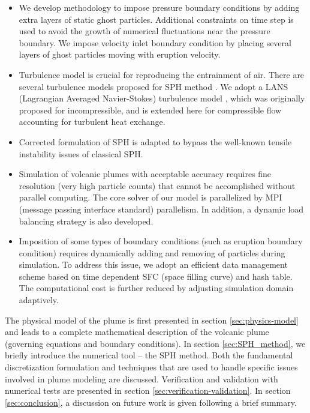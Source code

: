 \documentclass[journal abbreviation, manuscript]{copernicus}
\begin{document}
\begin{itemize}
\item We develop methodology to impose pressure boundary conditions by adding extra layers of static ghost particles. Additional constraints on time step is used to avoid the growth of numerical fluctuations near the pressure boundary. We impose velocity inlet boundary condition by placing several layers of ghost particles moving with eruption velocity. 
\item Turbulence model is crucial for reproducing the entrainment of air. There are several turbulence models proposed for SPH method \citep{issa2005numerical,violeau2007numerical}. We adopt a LANS (Lagrangian Averaged Navier-Stokes) turbulence model \citep{monaghan2011turbulence}, which was originally proposed for incompressible, and is extended here for compressible flow accounting for turbulent heat exchange. 
\item Corrected formulation of SPH \citep{kumar2013parallel} is adapted to bypass the well-known tensile instability issues of classical SPH.
\item Simulation of volcanic plumes with acceptable accuracy requires fine resolution (very high particle counts) that cannot be accomplished without parallel computing. The core solver of our model is parallelized by MPI (message passing interface standard) parallelism. In addition, a dynamic load balancing strategy is also developed. 
\item Imposition of some types of boundary conditions (such as eruption boundary condition) requires dynamically adding and removing of particles during simulation. To address this issue, we adopt an efficient data management scheme based on time dependent SFC (space filling curve) and hash table. The computational cost is further reduced by adjusting simulation domain adaptively.
\end{itemize}

The physical model of the plume is first presented in section \ref{sec:physics-model} and leads to a complete mathematical description of the volcanic plume (governing equations and boundary conditions). In section \ref{sec:SPH_method}, we  briefly introduce the numerical tool -- the SPH method. Both the fundamental discretization formulation and techniques that are used to handle specific issues involved in plume modeling are discussed. Verification and validation with numerical tests are presented in section \ref{sec:verification-validation}. In section \ref{sec:conclusion}, a discussion on future work is given following a brief summary.
\end{document}

